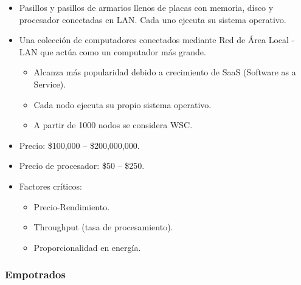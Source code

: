 \documentclass[12pt, twoside, openright]{report} %
\begin{document}
\begin{itemize}

	\item Pasillos y pasillos de armarios llenos de placas con memoria,
	      disco y procesador conectadas en LAN. Cada uno ejecuta su sistema
	      operativo.
	\item Una colección de computadores conectados mediante Red de Área
	      Local - LAN que actúa como un computador más grande.

	      \begin{itemize}

		      \item Alcanza más popularidad debido a crecimiento de SaaS (Software
		            as a Service).
		      \item Cada nodo ejecuta su propio sistema operativo.
		      \item A partir de 1000 nodos se considera WSC.
	      \end{itemize}
	\item Precio: \$100,000 -- \$200,000,000.
	\item Precio de procesador: \$50 -- \$250.
	\item Factores críticos:

	      \begin{itemize}

		      \item Precio-Rendimiento.
		      \item Throughput (tasa de procesamiento).
		      \item Proporcionalidad en energía.
	      \end{itemize}
\end{itemize}

\subsubsection{Empotrados}
\end{document}
